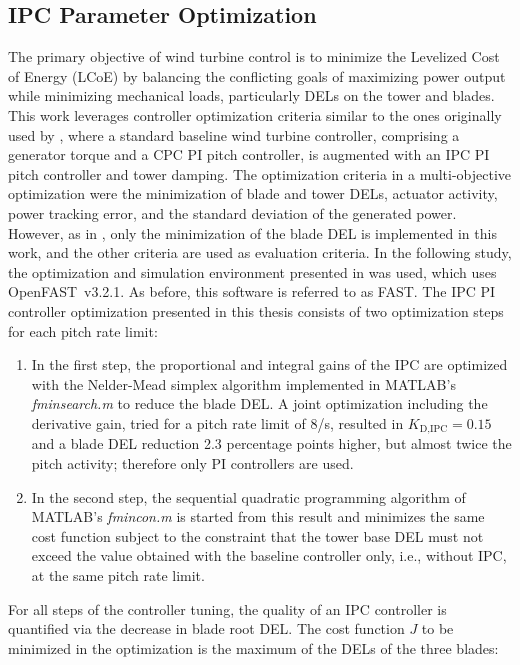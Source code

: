 \subsection{IPC Parameter Optimization} \label{subsection: IPCOptCriteria}
The primary objective of wind turbine control is to minimize the Levelized Cost of Energy (LCoE) by balancing the conflicting goals of maximizing power output while minimizing mechanical loads, particularly DELs on the tower and blades. This work leverages controller optimization criteria similar to the ones originally used by \cite{hoffmann2018load}, where a standard baseline wind turbine controller, comprising a generator torque and a CPC PI pitch controller, is augmented with an IPC PI pitch controller and tower damping. The optimization criteria in a multi-objective optimization were the minimization of blade and tower DELs, actuator activity, power tracking error, and the standard deviation of the generated power. However, as in \cite{dittmer2024combined}, only the minimization of the blade DEL is implemented in this work, and the other criteria are used as evaluation criteria. In the following study, the optimization and simulation environment presented in \cite{dittmer2024combined} was used, which uses OpenFAST~v3.2.1. As before, this software is referred to as FAST.
%
The IPC PI controller optimization presented in this thesis consists of two optimization steps for each pitch rate limit:
\begin{enumerate}
    \item In the first step, the proportional and integral gains of the IPC are optimized with the Nelder-Mead simplex algorithm implemented in MATLAB's \textit{fminsearch.m} to reduce the blade DEL. A joint optimization including the derivative gain, tried for a pitch rate limit of 8\textdegree/s, resulted in $K_{\text{D,IPC}} = 0.15$ and a blade DEL reduction 2.3 percentage points higher, but almost twice the pitch activity; therefore only PI controllers are used.
    \item In the second step, the sequential quadratic programming algorithm of MATLAB's \textit{fmincon.m} is started from this result and minimizes the same cost function subject to the constraint that the tower base DEL must not exceed the value obtained with the baseline controller only, i.e., without IPC, at the same pitch rate limit.
\end{enumerate}
For all steps of the controller tuning, the quality of an IPC controller is quantified via the decrease in blade root DEL. The cost function $J$ to be minimized in the optimization is the maximum of the DELs of the three blades:
